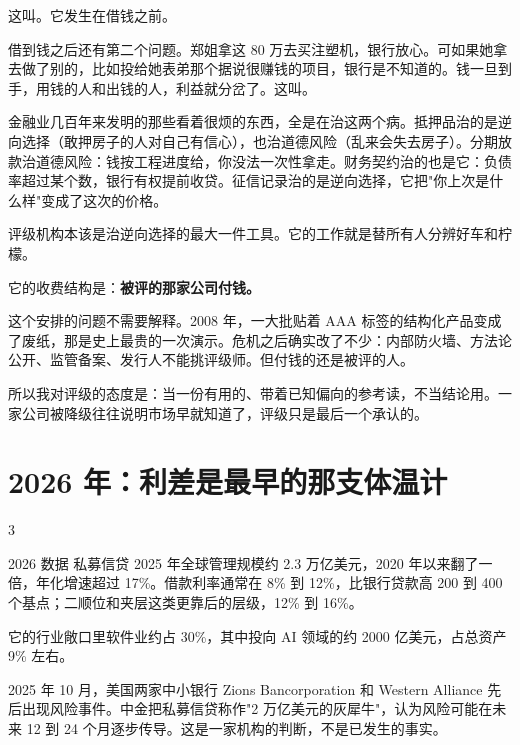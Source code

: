 这叫。它发生在借钱之前。

借到钱之后还有第二个问题。郑姐拿这 80 万去买注塑机，银行放心。可如果她拿去做了别的，比如投给她表弟那个据说很赚钱的项目，银行是不知道的。钱一旦到手，用钱的人和出钱的人，利益就分岔了。这叫。

金融业几百年来发明的那些看着很烦的东西，全是在治这两个病。抵押品治的是逆向选择（敢押房子的人对自己有信心），也治道德风险（乱来会失去房子）。分期放款治道德风险：钱按工程进度给，你没法一次性拿走。财务契约治的也是它：负债率超过某个数，银行有权提前收贷。征信记录治的是逆向选择，它把"你上次是什么样"变成了这次的价格。

评级机构本该是治逆向选择的最大一件工具。它的工作就是替所有人分辨好车和柠檬。

它的收费结构是：\textbf{被评的那家公司付钱。}

这个安排的问题不需要解释。2008 年，一大批贴着 AAA 标签的结构化产品变成了废纸，那是史上最贵的一次演示。危机之后确实改了不少：内部防火墙、方法论公开、监管备案、发行人不能挑评级师。但付钱的还是被评的人。

所以我对评级的态度是：当一份有用的、带着已知偏向的参考读，不当结论用。一家公司被降级往往说明市场早就知道了，评级只是最后一个承认的。

\section{2026 年：利差是最早的那支体温计}

\begin{statrow}{3}
\end{statrow}

\begin{databox}{2026 数据}
私募信贷 2025 年全球管理规模约 2.3 万亿美元，2020 年以来翻了一倍，年化增速超过 17\%。借款利率通常在 8\% 到 12\%，比银行贷款高 200 到 400 个基点；二顺位和夹层这类更靠后的层级，12\% 到 16\%。

它的行业敞口里软件业约占 30\%，其中投向 AI 领域的约 2000 亿美元，占总资产 9\% 左右。

2025 年 10 月，美国两家中小银行 Zions Bancorporation 和 Western Alliance 先后出现风险事件。中金把私募信贷称作"2 万亿美元的灰犀牛"，认为风险可能在未来 12 到 24 个月逐步传导。这是一家机构的判断，不是已发生的事实。

\end{databox}

